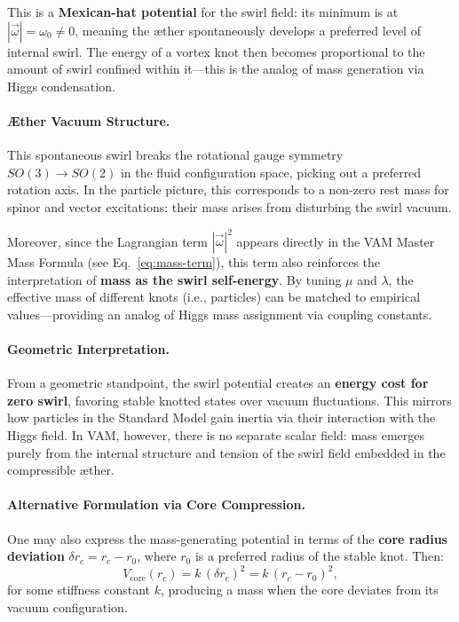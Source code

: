 This is a \textbf{Mexican-hat potential} for the swirl field: its minimum is at \( |\vec{\omega}| = \omega_0 \neq 0 \), meaning the æther spontaneously develops a preferred level of internal swirl. The energy of a vortex knot then becomes proportional to the amount of swirl confined within it—this is the analog of mass generation via Higgs condensation.

\vspace{0.5em}
\paragraph{Æther Vacuum Structure.}
This spontaneous swirl breaks the rotational gauge symmetry \( SO(3) \rightarrow SO(2) \) in the fluid configuration space, picking out a preferred rotation axis. In the particle picture, this corresponds to a non-zero rest mass for spinor and vector excitations: their mass arises from disturbing the swirl vacuum.

Moreover, since the Lagrangian term \( |\vec{\omega}|^2 \) appears directly in the VAM Master Mass Formula (see Eq.~\ref{eq:mass-term}), this term also reinforces the interpretation of \textbf{mass as the swirl self-energy}. By tuning \( \mu \) and \( \lambda \), the effective mass of different knots (i.e., particles) can be matched to empirical values—providing an analog of Higgs mass assignment via coupling constants.

\vspace{0.5em}
\paragraph{Geometric Interpretation.}
From a geometric standpoint, the swirl potential creates an \textbf{energy cost for zero swirl}, favoring stable knotted states over vacuum fluctuations. This mirrors how particles in the Standard Model gain inertia via their interaction with the Higgs field. In VAM, however, there is no separate scalar field: mass emerges purely from the internal structure and tension of the swirl field embedded in the compressible æther.

\vspace{0.5em}
\paragraph{Alternative Formulation via Core Compression.}
One may also express the mass-generating potential in terms of the \textbf{core radius deviation} \( \delta r_c = r_c - r_0 \), where \( r_0 \) is a preferred radius of the stable knot. Then:
\begin{equation}
    V_{\text{core}}(r_c) = k\, (\delta r_c)^2 = k\, (r_c - r_0)^2,
\end{equation}
for some stiffness constant \( k \), producing a mass when the core deviates from its vacuum configuration.


